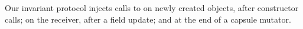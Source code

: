 Our invariant protocol injects calls to \Q@invariant@ on newly created objects, after constructor calls; on the receiver, after a field update; and \Q@this@ at the end of a capsule mutator.












